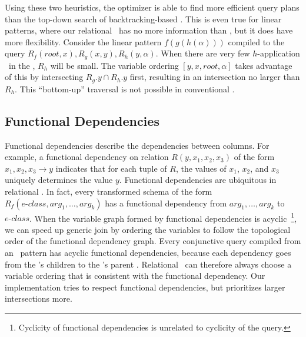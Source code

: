 Using these two heuristics,
 the optimizer is able to find more efficient query plans
 than the top-down search of backtracking-based \ematching.
This is even true for linear patterns,
 where our relational \ematching\ has no more information than
 \ematching, but it does have more flexibility.
Consider the linear pattern $f(g(h(\alpha)))$ compiled to
the query $R_f(\mathit{root}, x), R_g(x, y), R_h(y, \alpha)$.
When there are very few $h$-application \enodes\ in the \egraph,
 $R_h$ will be small.
The variable ordering $[y, x, \mathit{root}, \alpha]$
 takes advantage of this by
 intersecting $R_g.y \cap R_h.y$ first,
 resulting in an intersection no larger than $R_h$.
This ``bottom-up'' traversal is not possible in
 conventional \ematching.


\subsection{Functional Dependencies}
\label{sec:fd}

Functional dependencies describe the dependencies between columns. For example,
a functional dependency on relation $R(y, x_1, x_2, x_3)$ of the form
$x_1,x_2,x_3\rightarrow y$ indicates that
for each tuple of $R$,  the values of $x_1$, $ x_2$, and $x_3$ uniquely
determines the value $y$. Functional dependencies are ubiquitous in relational
\ematching. In fact, every transformed schema of the form $R_f(\textit{e-class},
\textit{arg}_1,\ldots, \textit{arg}_k)$ has a functional dependency from
$\textit{arg}_1,\ldots,\textit{arg}_k$ to $\textit{e-class}$.
When the variable graph formed by functional dependencies is
 acyclic~\footnote{Cyclicity of functional dependencies is unrelated to cyclicity of the query.},
 we can speed up generic join by ordering the variables to follow the
 topological order of the functional dependency graph.
Every conjunctive query compiled from an \ematching\ pattern
 has acyclic functional dependencies,
 because each dependency goes from the \enode's children to the \enode's parent \eclass.
Relational \ematching~can therefore always choose a variable
 ordering that is consistent with the functional dependency.
Our implementation tries to respect functional dependencies,
 but prioritizes larger intersections more.

